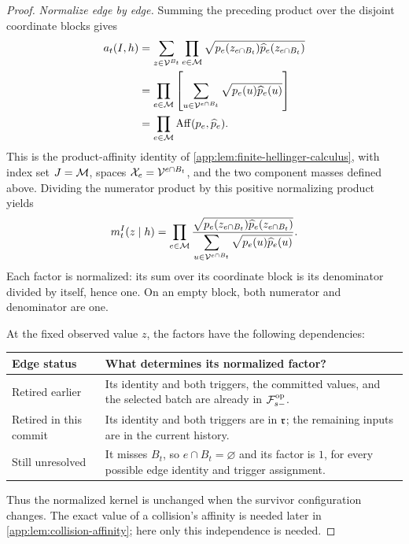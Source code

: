 \begin{proof}
\emph{Normalize edge by edge.}
Summing the preceding product over the disjoint coordinate blocks gives
\begin{align}
 a_{t}(I,h)
 &=\sum_{z\in\mathcal V^{B_t}}
     \prod_{e\in\mathcal M}
       \sqrt{p_e(z_{e\cap B_t})\widehat p_e(z_{e\cap B_t})}\notag\\
 &=\prod_{e\in\mathcal M}
     \left[\sum_{u\in\mathcal V^{e\cap B_t}}
                 \sqrt{p_e(u)\widehat p_e(u)}\right]\notag\\
 &=\prod_{e\in\mathcal M}\operatorname{Aff}(p_e,\widehat p_e).
 \label{app:eq:local-affinity-survivor-factorization}
\end{align}
This is the product-affinity identity of
\cref{app:lem:finite-hellinger-calculus}, with index set
\(J=\mathcal M\), spaces \(\mathcal X_e=\mathcal V^{e\cap B_t}\),
and the two component masses defined above.
Dividing the numerator product by this positive normalizing product yields
\begin{equation}
 m_{t}^{I}(z\mid h)
 =\prod_{e\in\mathcal M}
 \frac{\sqrt{p_e(z_{e\cap B_t})\widehat p_e(z_{e\cap B_t})}}
      {\displaystyle\sum_{u\in\mathcal V^{e\cap B_t}}
                 \sqrt{p_e(u)\widehat p_e(u)}}.
 \label{app:eq:normalized-commit-survivor-likelihood}
\end{equation}
Each factor is normalized: its sum over its coordinate block is its
denominator divided by itself, hence one. On an empty block, both numerator
and denominator are one.

At the fixed observed value \(z\), the factors have the following
dependencies:
\begin{center}
\small
\begin{tabularx}{\linewidth}{@{}>{\raggedright\arraybackslash}p{.23\linewidth}
 >{\raggedright\arraybackslash}X@{}}
\toprule
Edge status & What determines its normalized factor? \\
\midrule
Retired earlier
& Its identity and both triggers, the committed values, and the selected
batch are already in \(\mathcal F^{\mathrm{op}}_{s-}\). \\
\addlinespace
Retired in this commit
& Its identity and both triggers are in \(\mathfrak r\);
the remaining inputs are in the current history. \\
\addlinespace
Still unresolved
& It misses \(B_t\), so \(e\cap B_t=\varnothing\) and its factor is \(1\),
for every possible edge identity and trigger assignment. \\
\bottomrule
\end{tabularx}
\end{center}
Thus the normalized kernel is unchanged when the survivor configuration
changes. The exact value of a collision's affinity is needed later in
\cref{app:lem:collision-affinity}; here only this independence is needed.


\end{proof}
